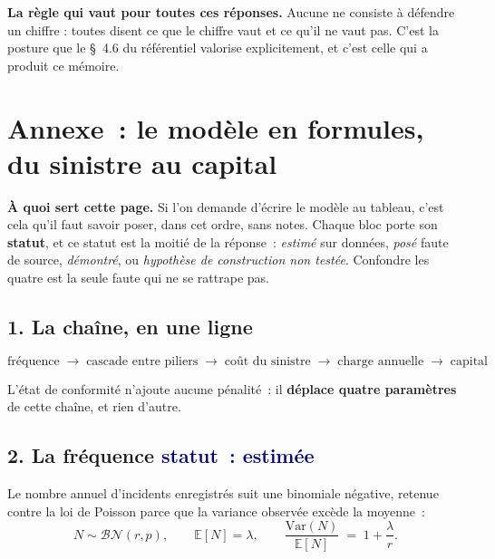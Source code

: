 
\begin{cle}
\textbf{La règle qui vaut pour toutes ces réponses.} Aucune ne consiste à défendre un chiffre :
toutes disent ce que le chiffre vaut et ce qu'il ne vaut pas. C'est la posture que le \S~4.6 du
référentiel valorise explicitement, et c'est celle qui a produit ce mémoire.
\end{cle}

\newpage
\section*{Annexe~: le modèle en formules, du sinistre au capital}

\begin{cle}
\textbf{À quoi sert cette page.} Si l'on demande d'écrire le modèle au tableau, c'est cela qu'il
faut savoir poser, dans cet ordre, sans notes. Chaque bloc porte son \textbf{statut}, et ce statut
est la moitié de la réponse~: \emph{estimé} sur données, \emph{posé} faute de source,
\emph{démontré}, ou \emph{hypothèse de construction non testée}. Confondre les quatre est la
seule faute qui ne se rattrape pas.
\end{cle}

\subsection*{1. La chaîne, en une ligne}

\[
\text{fréquence} \;\longrightarrow\; \text{cascade entre piliers} \;\longrightarrow\;
\text{coût du sinistre} \;\longrightarrow\; \text{charge annuelle} \;\longrightarrow\;
\text{capital}
\]

\noindent L'état de conformité n'ajoute aucune pénalité~: il \textbf{déplace quatre paramètres} de
cette chaîne, et rien d'autre.

\subsection*{2. La fréquence \quad\small\textcolor{navy}{statut~: estimée}\normalsize}

Le nombre annuel d'incidents enregistrés suit une binomiale négative, retenue contre la loi de
Poisson parce que la variance observée excède la moyenne~:
\[
N \sim \mathcal{BN}(r,p), \qquad \mathbb{E}[N]=\lambda, \qquad
\frac{\mathrm{Var}(N)}{\mathbb{E}[N]} \;=\; 1+\frac{\lambda}{r}.
\]

